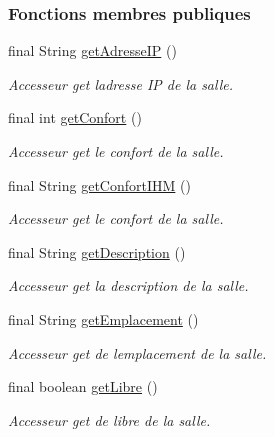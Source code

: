 \subsubsection*{Fonctions membres publiques}
\begin{DoxyCompactItemize}
\item 
final String \hyperlink{classcom_1_1lasalle_1_1meeting_1_1_salle_a2189e9d589972421a0f57d045471caa8}{get\+Adresse\+IP} ()
\begin{DoxyCompactList}\small\item\em Accesseur get l\textquotesingle{}adresse IP de la salle. \end{DoxyCompactList}\item 
final int \hyperlink{classcom_1_1lasalle_1_1meeting_1_1_salle_a8f29b7c1302251eed004d0828b7b2ab8}{get\+Confort} ()
\begin{DoxyCompactList}\small\item\em Accesseur get le confort de la salle. \end{DoxyCompactList}\item 
final String \hyperlink{classcom_1_1lasalle_1_1meeting_1_1_salle_abf1f96423a1df46ba4d6ac4a1b6d0c34}{get\+Confort\+I\+HM} ()
\begin{DoxyCompactList}\small\item\em Accesseur get le confort de la salle. \end{DoxyCompactList}\item 
final String \hyperlink{classcom_1_1lasalle_1_1meeting_1_1_salle_a253315cc4da23a4b8ab092e10be6d13d}{get\+Description} ()
\begin{DoxyCompactList}\small\item\em Accesseur get la description de la salle. \end{DoxyCompactList}\item 
final String \hyperlink{classcom_1_1lasalle_1_1meeting_1_1_salle_ac58600d946b6553858cc41be032473cd}{get\+Emplacement} ()
\begin{DoxyCompactList}\small\item\em Accesseur get de l\textquotesingle{}emplacement de la salle. \end{DoxyCompactList}\item 
final boolean \hyperlink{classcom_1_1lasalle_1_1meeting_1_1_salle_adc0c4936355bc0ae22991f69c12a5e42}{get\+Libre} ()
\begin{DoxyCompactList}\small\item\em Accesseur get de libre de la salle. \end{DoxyCompactList}\item 

\end{DoxyCompactItemize}
